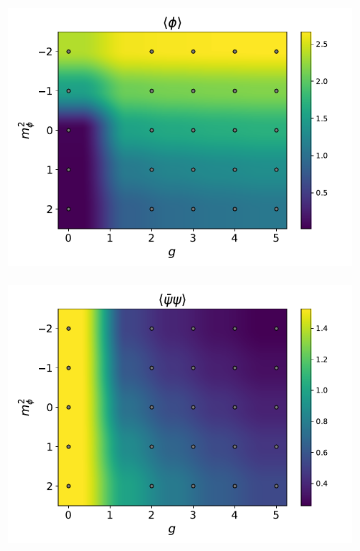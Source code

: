 \begin{figure}[htp]
    \centering
    \begin{subfigure}[b]{0.48\textwidth}
        \includegraphics[width=\textwidth]{figures/phase_diagram/g-m/phase_diagram_phi.pdf}
    \end{subfigure}
    \begin{subfigure}[b]{0.48\textwidth}
        \includegraphics[width=\textwidth]{figures/phase_diagram/g-m/phase_diagram_cond.pdf}
    \end{subfigure}
    \begin{subfigure}[b]{0.48\textwidth}

\end{subfigure}
\end{figure}
